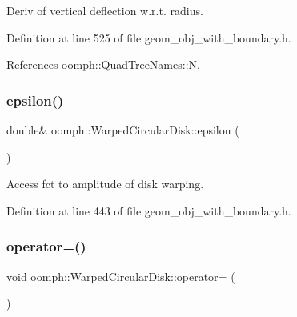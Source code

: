Deriv of vertical deflection w.\+r.\+t. radius. 



Definition at line 525 of file geom\+\_\+obj\+\_\+with\+\_\+boundary.\+h.



References oomph\+::\+Quad\+Tree\+Names\+::N.

\mbox{\label{classoomph_1_1WarpedCircularDisk_a275692443cbe30be492c6ef33040b0be}} 
\subsubsection{\texorpdfstring{epsilon()}{epsilon()}}
{\footnotesize\ttfamily double\& oomph\+::\+Warped\+Circular\+Disk\+::epsilon (\begin{DoxyParamCaption}{ }\end{DoxyParamCaption})\hspace{0.3cm}{\ttfamily [inline]}}



Access fct to amplitude of disk warping. 



Definition at line 443 of file geom\+\_\+obj\+\_\+with\+\_\+boundary.\+h.

\mbox{\label{classoomph_1_1WarpedCircularDisk_a08535ed3d62242444ab367f20f455c5b}} 
\subsubsection{\texorpdfstring{operator=()}{operator=()}}
{\footnotesize\ttfamily void oomph\+::\+Warped\+Circular\+Disk\+::operator= (\begin{DoxyParamCaption}\item[{const \hyperlink{classoomph_1_1WarpedCircularDisk}{Warped\+Circular\+Disk} \&}]{ }\end{DoxyParamCaption})\hspace{0.3cm}{\ttfamily [inline]}}



